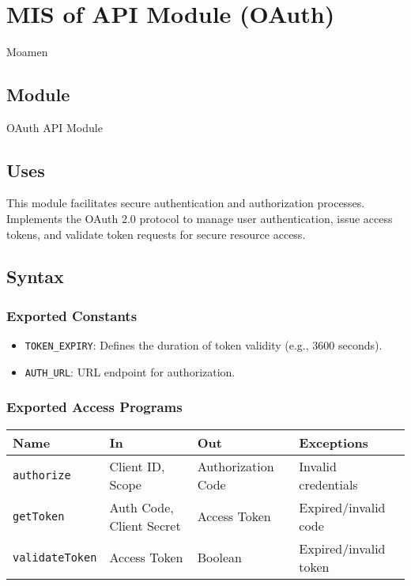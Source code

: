\documentclass[12pt, titlepage]{article}
\begin{document}
\newpage
~\newpage




\section{MIS of API Module (OAuth)} \label{Module_OAuth}
Moamen

\subsection{Module}

OAuth API Module

\subsection{Uses}

This module facilitates secure authentication and authorization processes. Implements the OAuth 2.0 protocol to manage user authentication, issue access tokens, and validate token requests for secure resource access.

\subsection{Syntax}

\subsubsection{Exported Constants}
\begin{itemize}
    \item \texttt{TOKEN\_EXPIRY}: Defines the duration of token validity (e.g., 3600 seconds).
    \item \texttt{AUTH\_URL}: URL endpoint for authorization.
\end{itemize}

\subsubsection{Exported Access Programs}

\begin{center}
\begin{tabular}{p{3cm} p{4cm} p{4cm} p{3.5cm}}
\hline
\textbf{Name} & \textbf{In} & \textbf{Out} & \textbf{Exceptions} \\
\hline
\texttt{authorize} & Client ID, Scope & Authorization Code & Invalid credentials \\
\texttt{getToken} & Auth Code, Client Secret & Access Token & Expired/invalid code \\
\texttt{validateToken} & Access Token & Boolean & Expired/invalid token \\
\hline
\end{tabular}
\end{center}
\end{document}
